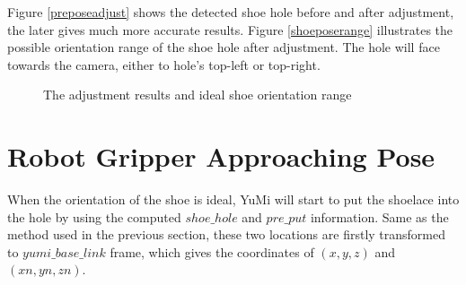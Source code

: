 Figure \ref{preposeadjust} shows the detected shoe hole before and after adjustment, the later gives much more accurate results. Figure \ref{shoeposerange} illustrates the possible orientation range of the shoe hole after adjustment. The hole will face towards the camera, either to hole's top-left or top-right.

\begin{figure}[H]
\centering
{}
\caption{The adjustment results and ideal shoe orientation range}
\end{figure}


\section{Robot Gripper Approaching Pose} \label{approachposegripper}
When the orientation of the shoe is ideal, YuMi will start to put the shoelace into the hole by using the computed $shoe\_hole$ and $pre\_put$ information. Same as the method used in the previous section, these two locations are firstly transformed to $yumi\_base\_link$ frame, which gives the coordinates of $(x, y, z)$ and $(xn, yn, zn)$.

